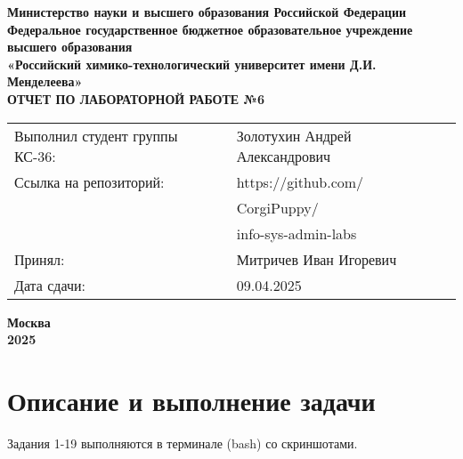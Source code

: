\documentclass[12pt, a4paper]{report}
\begin{document}
	\begin{titlepage}
		\begin{center}
			\large \textbf{Министерство науки и высшего образования Российской Федерации} \\
			\large \textbf{Федеральное государственное бюджетное образовательное учреждение высшего образования} \\
			\large \textbf{«Российский химико-технологический университет имени Д.И. Менделеева»} \\

			\vspace*{4cm}
			\LARGE \textbf{ОТЧЕТ ПО ЛАБОРАТОРНОЙ РАБОТЕ №6}

			\vspace*{4cm}
			\begin{flushright}
				\Large
				\begin{tabular}{>{\raggedleft\arraybackslash}p{8.85cm} p{10.8cm}}
					Выполнил студент группы КС-36: & Золотухин Андрей Александрович \\
					Ссылка на репозиторий: & https://github.com/ \\ 
					& CorgiPuppy/ \\
					& info-sys-admin-labs \\
					Принял: & Митричев Иван Игоревич \\
					Дата сдачи: & 09.04.2025 \\
				\end{tabular}

			\end{flushright}

			\vspace*{6cm}
			\Large \textbf{Москва \\ 2025}
		\end{center}
	\end{titlepage}
	
	\tableofcontents	
	\thispagestyle{empty}
	\newpage

	
	\section*{Описание и выполнение задачи}
	\large
	Задания 1-19 выполняются в терминале (bash) со скриншотами. \par
\end{document}
